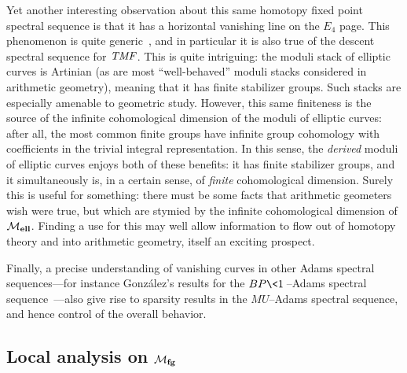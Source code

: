 Yet another interesting observation about this same homotopy fixed point spectral sequence is that it has a horizontal vanishing line on the \(E_4\) page.  This phenomenon is quite generic~\cite{MathewMeier}, and in particular it is also true of the descent spectral sequence for \(\mathit{TMF}\).  This is quite intriguing: the moduli stack of elliptic curves is Artinian (as are most ``well-behaved'' moduli stacks considered in arithmetic geometry), meaning that it has finite stabilizer groups.  Such stacks are especially amenable to geometric study.  However, this same finiteness is the source of the infinite cohomological dimension of the moduli of elliptic curves: after all, the most common finite groups have infinite group cohomology with coefficients in the trivial integral representation.  In this sense, the \emph{derived} moduli of elliptic curves enjoys both of these benefits: it has finite stabilizer groups, and it simultaneously is, in a certain sense, of \emph{finite} cohomological dimension.  Surely this is useful for something: there must be some facts that arithmetic geometers wish were true, but which are stymied by the infinite cohomological dimension of \(\mathcal{M}_{\mathbf{ell}}\).  Finding a use for this may well allow information to flow out of homotopy theory and into arithmetic geometry, itself an exciting prospect.

Finally, a precise understanding of vanishing curves in other Adams spectral sequences---for instance Gonz\'{a}lez's results for the \(BP\<1\>\)--Adams spectral sequence~\cite{Gonzalez}---also give rise to sparsity results in the \(MU\)--Adams spectral sequence, and hence control of the overall behavior.







\subsection*{Local analysis on \(\mathcal{M}_{\mathbf{fg}}\)}

